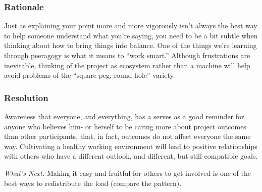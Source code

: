 \subsubsection*{Rationale} Just as explaining your point more and more vigorously
isn't always the best way to help someone understand what you're
saying, you need to be a bit subtle when thinking about how to bring
things into balance.  One of the things we're learning through
peeragogy is what it means to ``work smart.''  Although frustrations
are inevitable, thinking of the project as ecosystem rather than a
machine will help avoid problems of the ``square peg, round hole''
variety.

\subsubsection*{Resolution}
Awareness that everyone, and everything, has a  serves as a good reminder for anyone who believes him- or
herself to be caring more about project outcomes than other
participants, that, in fact, outcomes do not affect everyone the same way.
Cultivating a healthy working environment will lead to positive relationships
with others who have a different outlook, and different, but still compatible goals.

\begin{framed}
\emph{What's Next.}
Making it easy
and fruitful for others to get involved is one of the best ways to
redistribute the load (compare the
pattern).
\end{framed}

\endgroup

    
    
    
